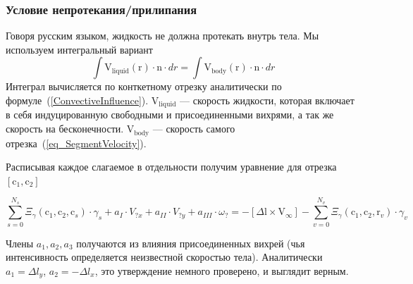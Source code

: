 \documentclass[a4paper,14pt]{extreport}
\newcommand{\br}[1]{\boldsymbol{\mathrm{#1}}}
\renewcommand{\vec}[1]{\br{#1}}
\begin{document}
\subsubsection{Условие непротекания/прилипания}
\label{slau_noslip}

Говоря русским языком, жидкость не должна протекать внутрь тела. Мы используем интегральный вариант
\begin{equation}
\int{\vec V_\text{liquid}(\vec r) \cdot \vec n \cdot dr} = \int {\vec V_\text{body}(\vec r) \cdot \vec n \cdot dr}
\end{equation}
Интеграл вычисляется по конткетному отрезку аналитически по формуле~(\ref{ConvectiveInfluence}). $\br V_\text{liquid}$ --- скорость жидкости, которая включает в себя индуцированную свободными и присоединенными вихрями, а так же скорость на бесконечности. $\br V_\text{body}$ --- скорость самого отрезка~(\ref{eq_SegmentVelocity}).

Расписывая каждое слагаемое в отдельности получим уравнение для отрезка $[\vec c_1, \vec c_2]$

\begin{equation}
\label{eq_noslip}
\sum_{s=0}^{N_s} \Xi_\gamma(\vec c_1, \vec c_2, \vec c_s)\cdot \gamma_s
+ a_{I} \cdot V_{?x} + a_{II} \cdot V_{?y} + a_{III} \cdot \omega_?
=
-[\Delta \vec l \times \vec V_\infty] - \sum\limits_{v=0}^{N_v} \Xi_\gamma (\vec c_1, \vec c_2, \vec r_v) \cdot \gamma_v
\end{equation}


Члены $a_1, a_2, a_3$ получаются из влияния присоединенных вихрей (чья интенсивность определяется неизвестной скоростью тела). Аналитически $a_1 = \Delta l_y$, $a_2 = -\Delta l_x$, это утверждение немного проверено, и выглядит верным.
\end{document}
